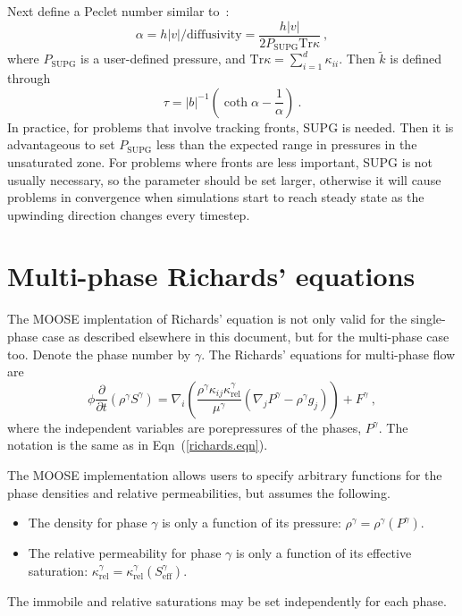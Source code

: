 \documentclass[]{scrreprt}
\begin{document}
Next define a Peclet number similar to~\cite{hughesET1986}:
\begin{equation}
\alpha = h|v|/\mathrm{diffusivity} =
\frac{h|v|}{2P_{\mathrm{SUPG}}\mbox{Tr}\kappa}
\ ,
\end{equation}
where $P_{\mathrm{SUPG}}$ is a user-defined pressure, and
$\mbox{Tr}\kappa = \sum_{i=1}^{d}\kappa_{ii}$.  Then $\tilde{k}$ is
defined through
\begin{equation}
\tau = |b|^{-1} \left( \coth\alpha - \frac{1}{\alpha}\right) \ .
\end{equation}
In practice, for problems that involve tracking fronts, SUPG is
needed.  Then it is advantageous to set $P_{\mathrm{SUPG}}$ less than
the expected range in pressures in the unsaturated zone.  For problems
where fronts are less important, SUPG is not usually necessary, so the
parameter should be set larger, otherwise it will cause problems in
convergence when simulations start to reach steady state as the upwinding direction changes every timestep.



\chapter{Multi-phase Richards' equations}
\label{chap.multi}

The MOOSE implentation of Richards' equation is not only valid for the
single-phase case as described elsewhere in this document, but for the
multi-phase case too.  Denote the phase number by $\gamma$.  The
Richards' equations for multi-phase flow are
\begin{equation}
\phi \frac{\partial}{\partial t} \left( \rho^{\gamma} S^{\gamma} \right) = \nabla_{i}
\left( \frac{\rho^{\gamma} \kappa_{ij}\kappa^{\gamma}_{\mathrm{rel}}}{\mu^{\gamma}} (\nabla_{j}P^{\gamma} - \rho^{\gamma}
g_{j}) \right)
+ F^{\gamma} \ ,
\label{richards.eqn.multi}
\end{equation}
where the independent variables are porepressures of the phases, $P^{\gamma}$.
The notation is the same as in Eqn~(\ref{richards.eqn}).

The MOOSE
implementation allows users to specify arbitrary functions for the
phase densities and relative permeabilities, but assumes the following.
\begin{itemize}
\item The density for phase $\gamma$ is only a function of its
  pressure: $\rho^{\gamma} = \rho^{\gamma}(P^{\gamma})$.
\item The relative permeability for phase $\gamma$ is only a function
  of its effective saturation: $\kappa^{\gamma}_{\mathrm{rel}} =
  \kappa^{\gamma}_{\mathrm{rel}}(S^{\gamma}_{\mathrm{eff}})$.
\end{itemize}
The immobile and relative saturations may be set independently for
each phase.
\end{document}
